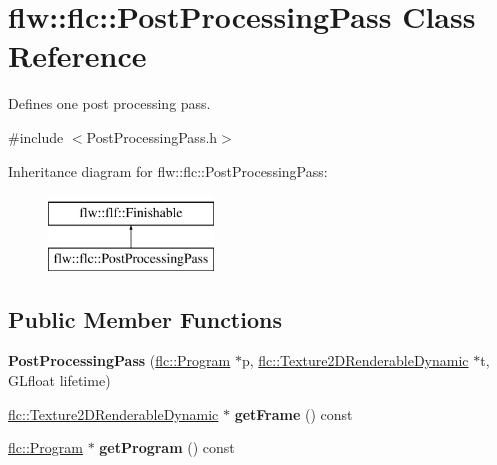 \hypertarget{classflw_1_1flc_1_1PostProcessingPass}{}\section{flw\+:\+:flc\+:\+:Post\+Processing\+Pass Class Reference}
\label{classflw_1_1flc_1_1PostProcessingPass}


Defines one post processing pass.  




{\ttfamily \#include $<$Post\+Processing\+Pass.\+h$>$}

Inheritance diagram for flw\+:\+:flc\+:\+:Post\+Processing\+Pass\+:\begin{figure}[H]
\begin{center}
\leavevmode
\includegraphics[height=2.000000cm]{classflw_1_1flc_1_1PostProcessingPass}
\end{center}
\end{figure}
\subsection*{Public Member Functions}
\begin{DoxyCompactItemize}
\item 
\mbox{\label{classflw_1_1flc_1_1PostProcessingPass_ab2d9a6822f4ecfcc711efd14007338ac}} 
{\bfseries Post\+Processing\+Pass} (\hyperlink{classflw_1_1flc_1_1Program}{flc\+::\+Program} $\ast$p, \hyperlink{classflw_1_1flc_1_1Texture2DRenderableDynamic}{flc\+::\+Texture2\+D\+Renderable\+Dynamic} $\ast$t, G\+Lfloat lifetime)
\item 
\mbox{\label{classflw_1_1flc_1_1PostProcessingPass_a914d3af2ffeffc7d59af22cd4b90947d}} 
\hyperlink{classflw_1_1flc_1_1Texture2DRenderableDynamic}{flc\+::\+Texture2\+D\+Renderable\+Dynamic} $\ast$ {\bfseries get\+Frame} () const
\item 
\mbox{\label{classflw_1_1flc_1_1PostProcessingPass_ad4ffb1859f652c204169725cc408692a}} 
\hyperlink{classflw_1_1flc_1_1Program}{flc\+::\+Program} $\ast$ {\bfseries get\+Program} () const
\end{DoxyCompactItemize}
